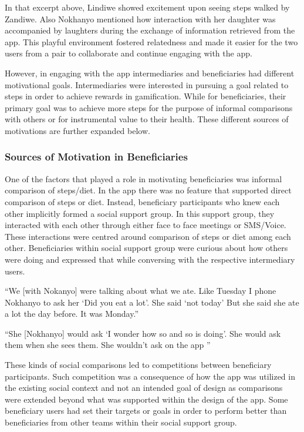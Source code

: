 In that excerpt above, Lindiwe showed excitement upon seeing steps walked by Zandiwe. Also Nokhanyo mentioned how interaction with her daughter was accompanied by laughters during the exchange of information retrieved from the app. This playful environment fostered relatedness and made it easier for the two users from a pair to collaborate and continue engaging with the app. 

However, in engaging with the app intermediaries and beneficiaries had different motivational goals. Intermediaries were interested in pursuing a goal related to steps in order to achieve rewards in gamification. While for beneficiaries, their primary goal was to achieve more steps for the purpose of informal comparisons with others or for instrumental value to their health. These different sources of motivations are further expanded below.
\subsubsection{Sources of Motivation in Beneficiaries}
One of the factors that played a role in motivating beneficiaries was informal comparison of steps/diet. In the app there was no feature that supported direct comparison of steps or diet. Instead, beneficiary participants who knew each other implicitly formed a social support group. In this support group, they interacted with each other through either face to face meetings or SMS/Voice. These interactions were centred around comparison of steps or diet among each other. Beneficiaries within social support group were curious about how others were doing and expressed that while conversing with the respective intermediary users.

 {``We [with Nokanyo] were talking about what we ate. Like Tuesday I phone Nokhanyo to ask her `Did you eat a lot'. She said `not today' But she said she ate a lot the day before. It was Monday.''}

 {``She [Nokhanyo] would ask `I wonder how so and so is doing'. She would ask them when she sees them. She wouldn't ask on the app ''} 

These kinds of social comparisons led to competitions between beneficiary participants. Such competition was a consequence of how the app was utilized in the existing social context and not an intended goal of design as comparisons were extended beyond what was supported within the design of the app. Some beneficiary users had set their targets or goals in order to perform better than beneficiaries from other teams within their social support group. 

